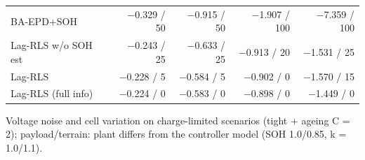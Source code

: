 \begin{table}[t]
\begin{tabular}{lrrrr}
   BA-EPD+SOH & $-$0.329 / 50 & $-$0.915 / 50 & $-$1.907 / 100 & $-$7.359 / 100 \\
   Lag-RLS w/o SOH est & $-$0.243 / 25 & $-$0.633 / 25 & $-$0.913 / 20 & $-$1.531 / 25 \\
   Lag-RLS & $-$0.228 / 5 & $-$0.584 / 5 & $-$0.902 / 0 & $-$1.570 / 15 \\
   Lag-RLS (full info) & $-$0.224 / 0 & $-$0.583 / 0 & $-$0.898 / 0 & $-$1.449 / 0 \\
\bottomrule
\end{tabular}
\par\vspace{2pt}\parbox{\linewidth}{\scriptsize Voltage noise and cell variation on charge-limited scenarios (tight + ageing C = 2); payload/terrain: plant differs from the controller model (SOH 1.0/0.85, k = 1.0/1.1).}
\end{table}
